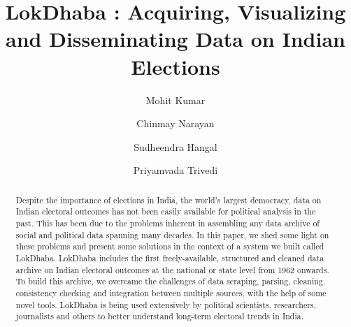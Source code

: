 \documentclass[sigconf]{acmart}
\begin{document}
\title{LokDhaba : Acquiring, Visualizing and Disseminating Data on Indian Elections}


\author{Mohit Kumar}

\author{Chinmay Narayan}

\author{Sudheendra Hangal}

\author{Priyamvada Trivedi}

\renewcommand{\shortauthors}{Kumar and Narayan, et al.}

\begin{abstract}
  Despite the importance of elections in India, the world's largest democracy, data on Indian electoral outcomes has not been easily available for political analysis in the past. This has been due to the problems inherent in assembling any data archive of social and political data spanning many decades. In this paper, we shed some light on these problems and present some solutions in the context of a system we built called LokDhaba. LokDhaba includes the first freely-available, structured and cleaned data archive on Indian electoral outcomes at the national or state level from 1962 onwards. To build this archive, we overcame the challenges of data scraping, parsing, cleaning, consistency checking and integration between multiple sources, with the help of some novel tools. LokDhaba is being used extensively by political scientists, researchers, journalists and others to better understand long-term electoral trends in India.
\end{abstract}
\end{document}
